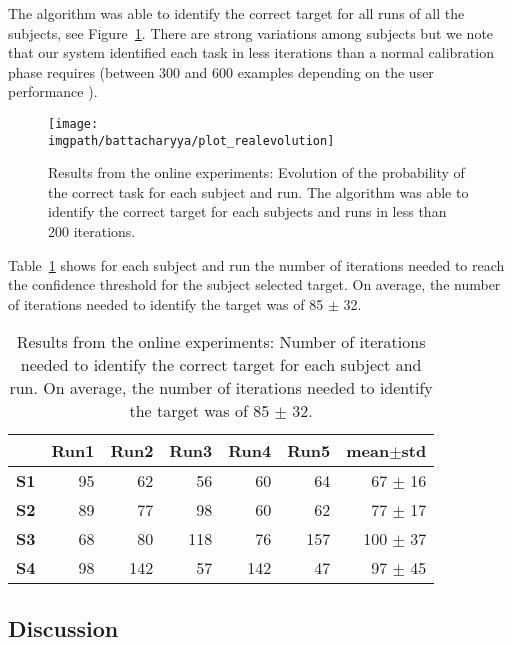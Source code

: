 The algorithm was able to identify the correct target for all runs of all the subjects, see Figure~\ref{fig:overlaponlineresults}. There are strong variations among subjects but we note that our system identified each task in less iterations than a normal calibration phase requires (between 300 and 600 examples depending on the user performance \cite{chavarriaga2010learning,iturrate2010single}).

\begin{figure}[!htbp]
    \centering
    \texttt{[image: \\imgpath/battacharyya/plot\_realevolution]}    
    \caption{Results from the online experiments: Evolution of the probability of the correct task for each subject and run. The algorithm was able to identify the correct target for each subjects and runs in less than 200 iterations.}
    \label{fig:overlaponlineresults} 
\end{figure}

Table~\ref{tab:overlaponline} shows for each subject and run the number of iterations needed to reach the confidence threshold for the subject selected target. On average, the number of iterations needed to identify the target was of 85 $\pm$ 32.

\begin{table}[!htbp]
\centering
{}
\begin{footnotesize}
\begin{tabular}{r|rrrrr|r}
    & \textbf{Run1} & \textbf{Run2} & \textbf{Run3} & \textbf{Run4} & \textbf{Run5} & \textbf{mean$\pm$std} \\\hline
    \textbf{S1} & 95 & 62 & 56 & 60 & 64 & 67 $\pm$ 16 \\
    \textbf{S2} & 89 & 77 & 98 & 60 & 62  & 77 $\pm$ 17 \\
    \textbf{S3} & 68 & 80 & 118 & 76 & 157 & 100 $\pm$ 37 \\
    \textbf{S4} & 98 & 142 & 57 & 142 & 47 & 97 $\pm$ 45 \\
\end{tabular}
\end{footnotesize}
  \caption{Results from the online experiments: Number of iterations needed to identify the correct target for each subject and run. On average, the number of iterations needed to identify the target was of 85 $\pm$ 32.}
  \label{tab:overlaponline}
\end{table}

\subsection{Discussion}


